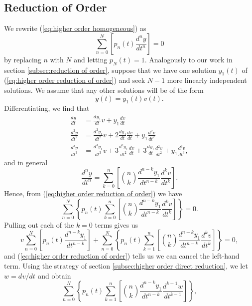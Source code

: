 \documentclass{myart}
\newcommand{\eq}[1]{(\ref{eq:#1})}
\newcommand{\deriv}[3][]{\frac{d^{#1}#2}{d#3^{#1}}}
\newcommand{\fderiv}[3][]{d^{#1}#2/d#3^{#1}}
\begin{document}
\subsection{Reduction of Order} \label{subsec:higher order reduction of order}

We rewrite \eq{higher order homogeneous} as
\begin{equation} \label{eq:higher order reduction of order}
\sum_{n=0}^N \left[p_n(t) \deriv[n]{y}{t}\right] = 0
\end{equation}
by replacing $n$ with $N$ and letting $p_N(t) = 1$. Analogously to our work in section \ref{subsec:reduction of order}, suppose that we have one solution $y_1(t)$ of \eq{higher order reduction of order} and seek $N - 1$ more linearly independent solutions. We assume that any other solutions will be of the form
\begin{equation*}
y(t) = y_1(t)v(t).
\end{equation*}
Differentiating, we find that
\begin{align*}
\deriv{y}{t} &= \deriv{y_1}{t} v + y_1 \deriv{v}{t} \\
\deriv[2]{y}{t} &= \deriv[2]{y_1}{t} v + 2 \deriv{y_1}{t} \deriv{v}{t} + y_1 \deriv[2]{v}{t} \\
\deriv[3]{y}{t} &= \deriv[3]{y_1}{t} v + 3 \deriv[2]{y_1}{t} \deriv{v}{t} + 3 \deriv{y_1}{t} \deriv[2]{v}{t} + y_1 \deriv[3]{v}{t},
\end{align*}
and in general
\begin{equation*}
\deriv[n]{y}{t} = \sum_{k=0}^n \left[\binom{n}{k} \deriv[n-k]{y_1}{t} \deriv[k]{v}{t}\right].
\end{equation*}
Hence, from \eq{higher order reduction of order} we have
\begin{equation*}
\sum_{n=0}^N \left\{p_n(t) \sum_{k=0}^n \left[\binom{n}{k} \deriv[n-k]{y_1}{t} \deriv[k]{v}{t}\right]\right\} = 0.
\end{equation*}
Pulling out each of the $k = 0$ terms gives us
\begin{equation*}
v \sum_{n=0}^N \left[p_n(t) \deriv[n-k]{y_1}{t}\right] + \sum_{n=0}^N \left\{p_n(t) \sum_{k=1}^n \left[\binom{n}{k} \deriv[n-k]{y_1}{t} \deriv[k]{v}{t}\right]\right\} = 0,
\end{equation*}
and \eq{higher order reduction of order} tells us we can cancel the left-hand term. Using the strategy of section \ref{subsec:higher order direct reduction}, we let $w = \fderiv{v}{t}$ and obtain
\begin{equation} \label{eq:reduced order}
\sum_{n=0}^N \left\{p_n(t) \sum_{k=1}^n \left[\binom{n}{k} \deriv[n-k]{y_1}{t} \deriv[k-1]{w}{t}\right]\right\},
\end{equation}
\end{document}
